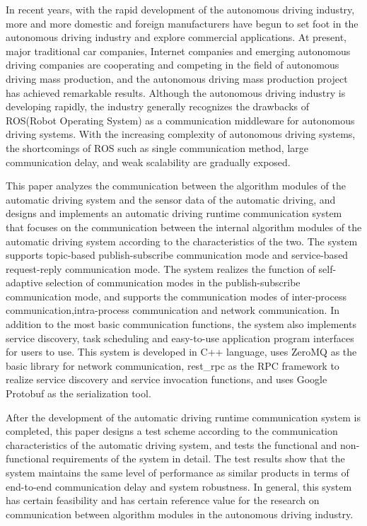 \begin{abstract*}
  In recent years, with the rapid development of the autonomous driving industry, 
  more and more domestic and foreign manufacturers have begun to set foot in the autonomous driving industry and explore commercial applications. 
  At present, major traditional car companies, Internet companies and emerging autonomous driving companies are cooperating and competing in the field of autonomous driving mass production,
  and the autonomous driving mass production project has achieved remarkable results.
  Although the autonomous driving industry is developing rapidly,
  the industry generally recognizes the drawbacks of ROS(Robot Operating System) as a communication middleware for autonomous driving systems. 
  With the increasing complexity of autonomous driving systems, 
  the shortcomings of ROS such as single communication method, 
  large communication delay, and weak scalability are gradually exposed.

  This paper analyzes the communication between the algorithm modules of the automatic driving system and the sensor data of the automatic driving, 
  and designs and implements an automatic driving runtime communication system that focuses on the communication between the internal algorithm modules of the automatic driving system according to the characteristics of the two. 
  The system supports topic-based publish-subscribe communication mode and service-based request-reply communication mode. The system realizes the function of self-adaptive selection of communication modes in the publish-subscribe communication mode, 
  and supports the communication modes of inter-process communication,intra-process communication and network communication.
  In addition to the most basic communication functions, the system also implements service discovery, 
  task scheduling and easy-to-use application program interfaces for users to use. This system is developed in C++ language,
  uses ZeroMQ as the basic library for network communication, rest\_rpc as the RPC framework to realize service discovery and service invocation functions,
  and uses Google Protobuf as the serialization tool.

  After the development of the automatic driving runtime communication system is completed, 
  this paper designs a test scheme according to the communication characteristics of the automatic driving system, 
  and tests the functional and non-functional requirements of the system in detail. 
  The test results show that the system maintains the same level of performance as similar products in terms of end-to-end communication delay and system robustness. 
  In general, this system has certain feasibility and has certain reference value for the research on communication between algorithm modules in the autonomous driving industry.
\end{abstract*}
